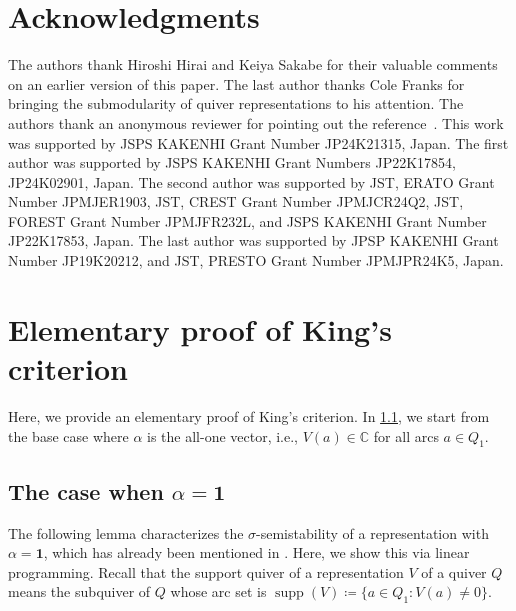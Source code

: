 \documentclass[a4paper,11pt]{article}
\numberwithin{equation}{section}
\newcommand{\C}{\mathbb{C}}
\newcommand{\ones}{\mathbf{1}}
\DeclareMathOperator{\supp}{supp}
\begin{document}
\section*{Acknowledgments}
The authors thank Hiroshi Hirai and Keiya Sakabe for their valuable comments on an earlier version of this paper.
The last author thanks Cole Franks for bringing the submodularity of quiver representations to his attention.
The authors thank an anonymous reviewer for pointing out the reference~\cite{Mulmuley2017}.
This work was supported by JSPS KAKENHI Grant Number JP24K21315, Japan.
The first author was supported by JSPS KAKENHI Grant Numbers JP22K17854, JP24K02901, Japan.
The second author was supported by JST, ERATO Grant Number JPMJER1903, JST, CREST Grant Number JPMJCR24Q2, JST, FOREST Grant Number JPMJFR232L, and JSPS KAKENHI Grant Number JP22K17853, Japan.
The last author was supported by JPSP KAKENHI Grant Number JP19K20212, and JST, PRESTO Grant Number JPMJPR24K5, Japan.

\printbibliography

\newpage
\appendix
\section{Elementary proof of King's criterion}\label{sec:King}
Here, we provide an elementary proof of King's criterion.
In \cref{sec:king-ones}, we start from the base case where $\alpha$ is the all-one vector, i.e., $V(a) \in \C$ for all arcs $a \in Q_1$.

\subsection{The case when $\alpha = \ones$}\label{sec:king-ones}

The following lemma characterizes the $\sigma$-semistability of a representation with $\alpha = \ones$, which has already been mentioned in .
Here, we show this via linear programming.
Recall that the support quiver of a representation $V$ of a quiver $Q$ means the subquiver of $Q$ whose arc set is $\supp(V) \coloneqq \{a \in Q_1 : V(a) \ne 0\}$.
\end{document}

